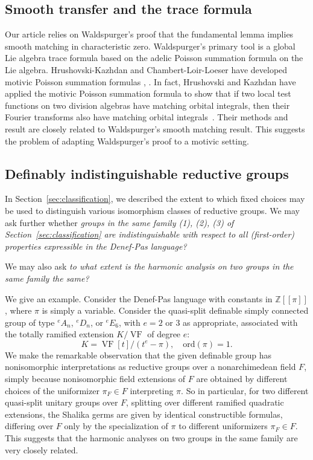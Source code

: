 \documentclass[12pt]{amsart}
\newcommand{\op}[1]{\operatorname{#1}}
\newcommand{\ring}[1]{{\mathbb #1}}
\def\VF{{\op{VF}}}
\newcommand\ord{\mathrm{ord}}
\theoremstyle{plain}
\theoremstyle{definition}
\begin{document}
\subsection{Smooth transfer and the trace formula}

Our article relies on Waldspurger's proof that the fundamental lemma
implies smooth matching in characteristic zero.  Waldspurger's primary
tool is a global Lie algebra trace formula based on the adelic Poisson
summation formula on the Lie algebra.  Hrushovski-Kazhdan and
Chambert-Loir-Loeser have developed motivic Poisson summation
formulas \cite{hrushovski2009motivic}, \cite{chambert2013motivic}.  In
fact, Hrushovski and Kazhdan have applied the motivic Poisson
summation formula to show that if two local test functions on two division
algebras have matching orbital integrals, then their Fourier
transforms also have matching orbital integrals~\cite[Theorem
1.1]{hrushovski2009motivic}.  Their methods and result are closely
related to Waldspurger's smooth matching result.  This suggests the
problem of adapting Waldspurger's proof to a motivic setting.

\subsection{Definably indistinguishable reductive groups}

In Section~\ref{sec:classification}, we described the extent to which
fixed choices may be used to distinguish various isomorphism classes
of reductive groups.  We may ask further whether {\it groups in the
  same family (1), (2), (3) of Section~\ref{sec:classification} are
  indistinguishable with respect to all (first-order) properties
  expressible in the Denef-Pas language?}

We may also ask {\it to what extent is the harmonic analysis on two groups
in the same family the same?}

We give an example.  Consider the Denef-Pas language with constants in
$\ring{Z}[[\pi]]$, where $\pi$ is simply a variable.  Consider the
quasi-split definable simply connected group of type ${}^eA_n$,
${}^eD_n$, or ${}^eE_6$, with $e=2$ or $3$ as appropriate, associated
with the totally ramified extension $K/\VF$ of degree $e$:
\[
K = \VF[t]/(t^e - \pi),\quad \ord (\pi) = 1.
\]
We make the remarkable observation that the given definable group has
nonisomorphic interpretations as reductive groups over a
nonarchimedean field $F$, simply because nonisomorphic field
extensions of $F$ are obtained by different choices of the uniformizer
$\pi_F\in F$ interpreting $\pi$.  So in particular, for two different
quasi-split unitary groups over $F$, splitting over different ramified
quadratic extensions, the Shalika germs are given by identical
constructible formulas, differing over $F$ only by the specialization
of $\pi$ to different uniformizers $\pi_F\in F$.  This suggests that
the harmonic analyses on two groups in the same family are very closely
related.
\end{document}
